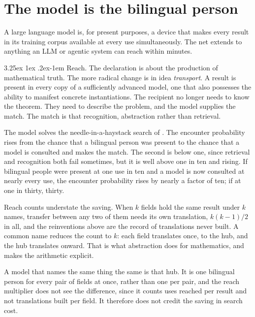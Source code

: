 \documentclass[11pt]{article}
\makeatletter
\renewcommand\paragraph{\@startsection{paragraph}{4}{\z@}%
  {3.25ex \@plus1ex \@minus.2ex}{-1em}%
  {\normalfont\normalsize\itshape}}
\theoremstyle{definition}
\theoremstyle{remark}
\makeatother
\begin{document}
\section{The model is the bilingual person}

A large language model is, for present purposes, a device that makes every result in its training corpus available at every use simultaneously. The net extends to anything an LLM or agentic system can reach within minutes.

\paragraph{Reach.}  The declaration is about the production of mathematical truth. The more radical change is in idea {\em transport}.
A result is present in every copy of a sufficiently advanced model, one that also possesses the ability to manifest concrete instantiations. The recipient no longer needs to know the theorem. They need to describe the problem, and the model supplies the match. The match is that recognition, abstraction rather than retrieval.

The model solves the needle-in-a-haystack search of \citet{agrawal2019}. The encounter probability rises from the chance that a bilingual person was present to the chance that a model is consulted and makes the match. The second is below one, since retrieval and recognition both fail sometimes, but it is well above one in ten and rising. If bilingual people were present at one use in ten and a model is now consulted at nearly every use, the encounter probability rises by nearly a factor of ten; if at one in thirty, thirty.

Reach counts understate the saving. When $k$ fields hold the same result under $k$ names, transfer between any two of them needs its own translation, $k(k-1)/2$ in all, and the reinventions above are the record of translations never built. A common name reduces the count to $k$: each field translates once, to the hub, and the hub translates onward. That is what abstraction does for mathematics, and \citet{cotton2026protocol} makes the arithmetic explicit.

A model that names the same thing the same is that hub. It is one bilingual person for every pair of fields at once, rather than one per pair, and the reach multiplier does not see the difference, since it counts uses reached per result and not translations built per field. It therefore does not credit the saving in search cost.
\end{document}
